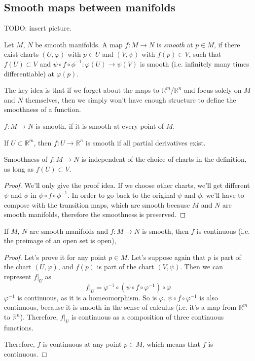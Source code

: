 \pagebreak
\subsection{Smooth maps between manifolds}
TODO: insert picture.

\begin{definition}
    Let $M$, $N$ be smooth manifolds.
    A map $f : M \to N$ is \textit{smooth} at $p \in M$,
    if there exist charts $(U, \varphi)$ with $p \in U$ and
    $(V, \psi)$ with $f(p) \in V$, such that $f(U) \subset V$ and
    $\psi \circ f \circ \phi^{-1} : \varphi(U) \to \psi(V)$
    is smooth (i.e. infinitely many times differentiable) at $\varphi(p)$.
\end{definition}
\begin{remark}
    The key idea is that if we forget about the maps to $\mathbb{R}^m$/$\mathbb{R}^n$
    and focus solely on $M$ and $N$ themselves, then we simply won't have enough
    structure to define the smoothness of a function.
\end{remark}
\begin{definition}
    $f : M \to N$ is smooth, if it is smooth at every point of $M$.
\end{definition}
\begin{remark}
    If $U \subset \mathbb{R}^m$, then $f : U \to \mathbb{R}^n$
    is smooth if all partial derivatives exist.
\end{remark}
\begin{lemma}
    \label{lem:independentOfChartChoice}
    Smoothness of $f : M \to N$ is independent of the choice of 
    charts in the definition, as long as $f(U) \subset V$.
\end{lemma}
\begin{proof}
    We'll only give the proof idea.
    If we choose other charts, we'll get different $\psi$ and $\phi$ in 
    $\psi \circ f \circ \phi^{-1}$. In order to go back to the original
    $\psi$ and $\phi$, we'll have to compose with the transition maps,
    which are smooth because $M$ and $N$ are smooth manifolds,
    therefore the smoothness is preserved.
\end{proof}
\begin{proposition}
    If $M$, $N$ are smooth manifolds and
    $f : M \to N$ is smooth, then $f$ is continuous (i.e. the preimage of 
    an open set is open),
\end{proposition}
\begin{proof}
    Let's prove it for any point $p \in M$.
    Let's suppose again that $p$ is part of the chart $(U, \varphi)$,
    and $f(p)$ is part of the chart $(V, \psi)$.
    Then we can represent $f|_U$ as
    \[
        f|_U = \varphi^{-1} \circ (\psi \circ f \circ \varphi^{-1}) \circ \varphi
    \]
    $\varphi^{-1}$ is continuous, as it is a homeomorphism. So is $\varphi$.
    $\psi \circ f \circ \varphi^{-1}$ is also continuous, because it is
    smooth in the sense of calculus (i.e. it's a map from $\mathbb{R}^m$ to $\mathbb{R}^n$).
    Therefore, $f|_U$ is continuous as a composition of three continuous functions.

    Therefore, $f$ is continuous at any point $p \in M$, which means that
    $f$ is continuous.
\end{proof}
